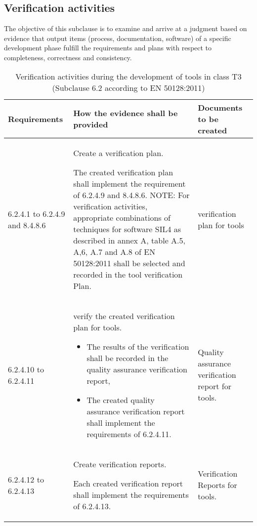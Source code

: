 \documentclass{template/openetcs_report}
\begin{document}
\subsection{Verification activities}
\begin{flushleft}
The objective of this subclause is to examine and arrive at a judgment based on evidence that output items (process, documentation, software) of a specific development phase fulfill the requirements and plans with respect to completeness, correctness and consistency.
\end{flushleft}
{\footnotesize\sffamily\centering
\begin{longtable}{|p{2cm}|p{9cm}|p{3cm}|}
\caption{Verification activities during the development of tools in class T3 (Subclause 6.2 according to EN 50128:2011)}\\
\hline
\bfseries Requirements & \bfseries How the evidence shall be provided & \bfseries Documents to be created\\
\hline
\hline
\endhead
\hline
\endfoot

6.2.4.1 to 6.2.4.9 and 8.4.8.6 & Create a verification plan.

The created verification plan shall implement the requirement of 6.2.4.9 and 8.4.8.6.
\linebreak
\linebreak
NOTE: \linebreak
For verification activities, appropriate combinations of techniques for software SIL4 as described in annex A, table A.5, A,6, A.7 and A.8 of EN 50128:2011 shall be selected and recorded in the tool verification Plan.
& verification plan for tools\\ 
\hline
6.2.4.10 to 6.2.4.11 & verify the created verification plan for tools. 
\begin{itemize}\itemsep=0pt
  \item The results of the verification shall be recorded in the quality assurance verification report,
  \item The created quality assurance verification report shall implement the requirements of 6.2.4.11. 
\end{itemize}
& Quality assurance verification report for tools.\\ 
\hline
6.2.4.12 to 6.2.4.13 & Create verification reports.

Each created verification report shall implement the requirements of 6.2.4.13.
& Verification Reports for tools.\\ 
\hline
\end{longtable}}
\end{document}
